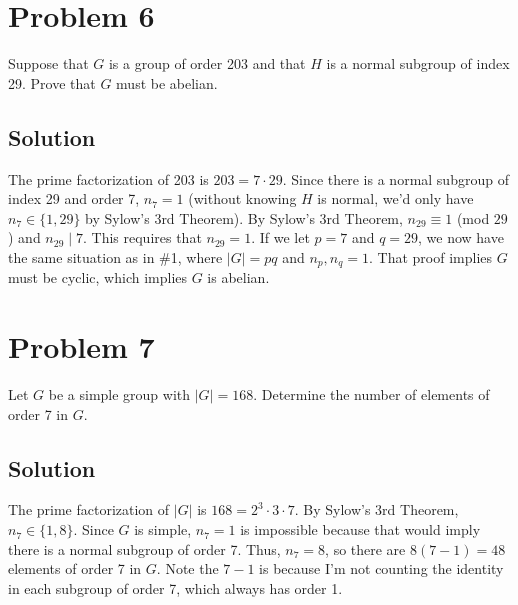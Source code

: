 \documentclass[fleqn]{article}
\begin{document}
    \section{Problem 6}
    Suppose that $G$ is a group of order 203 and that $H$ is a normal subgroup of index 29.  Prove that $G$ must be abelian.
        
        \subsection{Solution}
        The prime factorization of 203 is $203 = 7 \cdot 29$.  Since there is a normal subgroup of index 29 and order 7, $n_7 = 1$ (without knowing $H$ is normal, we'd only have $n_7 \in \{1, 29\}$ by Sylow's 3rd Theorem).  By Sylow's 3rd Theorem, $n_{29} \equiv 1$ (mod $29$) and $n_{29} \mid 7$.  This requires that $n_{29} = 1$.  If we let $p = 7$ and $q = 29$, we now have the same situation as in \#1, where $|G| = pq$ and $n_p, n_q = 1$.  That proof implies $G$ must be cyclic, which implies $G$ is abelian.
    
    \section{Problem 7}
    Let $G$ be a simple group with $|G| = 168$.  Determine the number of elements of order 7 in $G$.
        
        \subsection{Solution}
        The prime factorization of $|G|$ is $168 = 2^3 \cdot 3 \cdot 7$.  By Sylow's 3rd Theorem, $n_7 \in \{1, 8\}$.  Since $G$ is simple, $n_7 = 1$ is impossible because that would imply there is a normal subgroup of order 7.  Thus, $n_7 = 8$, so there are $8(7 - 1) = 48$ elements of order 7 in $G$.  Note the $7 - 1$ is because I'm not counting the identity in each subgroup of order 7, which always has order 1.
    
\end{document}
